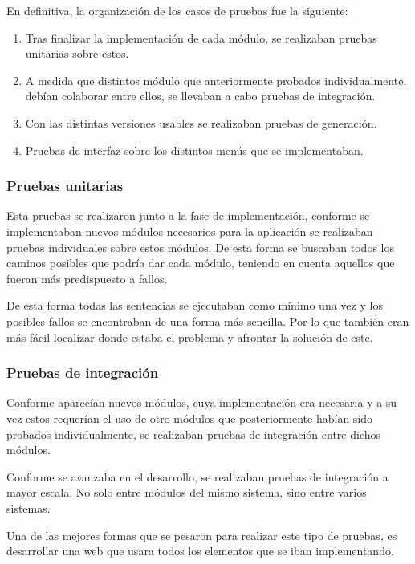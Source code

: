 \documentclass[a4paper,12pt]{article}
\begin{document}
En definitiva, la organización de los casos de pruebas fue la siguiente:

\begin{enumerate}
    \item Tras finalizar la implementación de cada módulo, se realizaban pruebas unitarias sobre estos.
    \item A medida que distintos módulo que anteriormente probados individualmente, debían colaborar entre ellos, se
    llevaban a cabo pruebas de integración.
    \item Con las distintas versiones usables se realizaban pruebas de generación.
    \item Pruebas de interfaz sobre los distintos menús que se implementaban.
\end{enumerate}

\subsubsection{Pruebas unitarias}

Esta pruebas se realizaron junto a la fase de implementación, conforme se implementaban nuevos módulos necesarios para la aplicación
se realizaban pruebas individuales sobre estos módulos. De esta forma se buscaban todos los caminos posibles que podría dar cada
módulo, teniendo en cuenta aquellos que fueran más predispuesto a fallos.

De esta forma todas las sentencias se ejecutaban como mínimo una vez y los posibles fallos se encontraban de una forma más sencilla.
Por lo que también eran más fácil localizar donde estaba el problema y afrontar la solución de este.

\subsubsection{Pruebas de integración}

Conforme aparecían nuevos módulos, cuya implementación era necesaria y a su vez estos requerían el uso de otro módulos que
posteriormente habían sido probados individualmente, se realizaban pruebas de integración entre dichos módulos.

Conforme se avanzaba en el desarrollo, se realizaban pruebas de integración a mayor escala. No solo entre módulos
del mismo sistema, sino entre varios sistemas.

Una de las mejores formas que se pesaron para realizar este tipo de pruebas, es desarrollar una web que usara todos los elementos
que se iban implementando.
\end{document}
